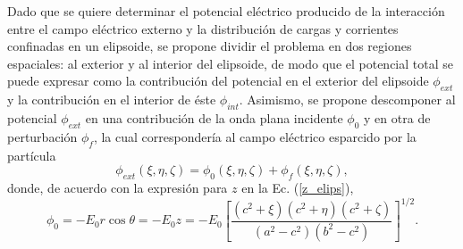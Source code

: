 Dado que se quiere determinar el potencial eléctrico producido de la interacción entre el campo eléctrico externo y la distribución de cargas y corrientes confinadas en un elipsoide, se propone dividir el problema en dos regiones espaciales: al exterior y al interior del elipsoide, de modo que el potencial total se puede expresar como la contribución del potencial en el exterior del elipsoide $\phi_{ext}$  y la contribución en el interior de éste $\phi_{int}$. Asimismo, se propone descomponer al potencial $\phi_{ext}$ en una contribución de la onda plana incidente $\phi_0$ y en otra de perturbación $\phi_f$, la cual correspondería al campo eléctrico esparcido por la partícula
\begin{equation}
	\phi_{ext}(\xi,\eta,\zeta)=\phi_0(\xi,\eta,\zeta)+\phi_f(\xi,\eta,\zeta),    
\end{equation}
donde, de acuerdo con la expresión para $z$ en la Ec. (\ref{z_elips}),
\begin{equation}
	\phi_0=-E_0 r\cos\theta=-E_0 z=-E_0\left[\frac{(c^2+\xi)(c^2+\eta)(c^2+\zeta)}{(a^2-c^2)(b^2-c^2)}\right]^{1/2}.
	\label{pot_0}
\end{equation}

